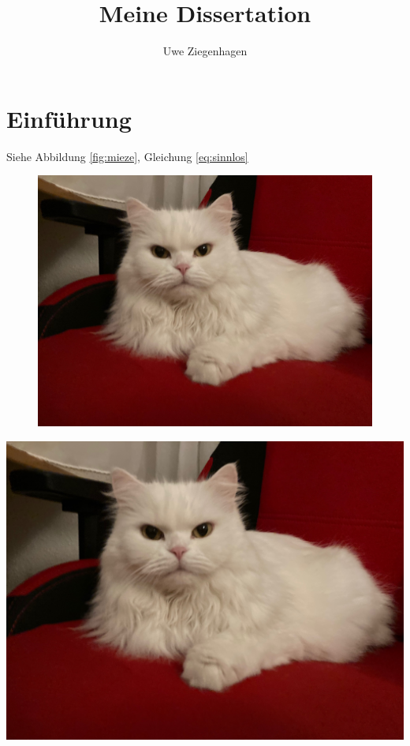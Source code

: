 \documentclass[ngerman,12pt]{scrreprt}
\author{Uwe Ziegenhagen}
\title{Meine Dissertation}
\begin{document}
\maketitle

\tableofcontents

\chapter{Einführung}

\blindtext[2] 

Siehe Abbildung \ref{fig:mieze}, Gleichung \ref{eq:sinnlos}

\begin{figure}
\includegraphics[width=\textwidth]{Bilder/Katze2}
\end{figure}

\blindtext[20]


\includegraphics[width=\textwidth]{Bilder/Katze2}
\label{fig:mieze}
\end{document}
